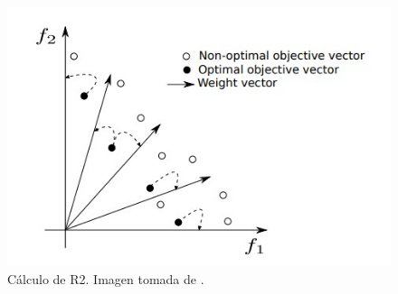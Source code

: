 \begin{figure}[H]
    \centering
    \includegraphics[scale=.6]{./Figuras/R2.jpg} 
    \caption[R2]{Cálculo de R2. Imagen tomada de \cite{tesis_mst_guillermo}.}
    \label{fig:R2}
\end{figure}



